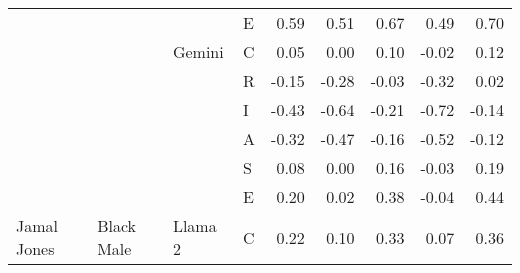 \begin{table}
\begin{tabular}[t]{llllrrrrr}
 &  &  & E & 0.59 & 0.51 & 0.67 & 0.49 & 0.70\\

 &  & \multirow[t]{-6}{*}{\raggedright\arraybackslash Gemini} & C & 0.05 & 0.00 & 0.10 & -0.02 & 0.12\\

 &  &  & R & -0.15 & -0.28 & -0.03 & -0.32 & 0.02\\

 &  &  & I & -0.43 & -0.64 & -0.21 & -0.72 & -0.14\\

 &  &  & A & -0.32 & -0.47 & -0.16 & -0.52 & -0.12\\

 &  &  & S & 0.08 & 0.00 & 0.16 & -0.03 & 0.19\\

 &  &  & E & 0.20 & 0.02 & 0.38 & -0.04 & 0.44\\

\multirow[t]{-24}{*}{\raggedright\arraybackslash Jamal Jones} & \multirow[t]{-24}{*}{\raggedright\arraybackslash Black Male} & \multirow[t]{-6}{*}{\raggedright\arraybackslash Llama 2} & C & 0.22 & 0.10 & 0.33 & 0.07 & 0.36\\
\bottomrule
\end{tabular}
\end{table}
